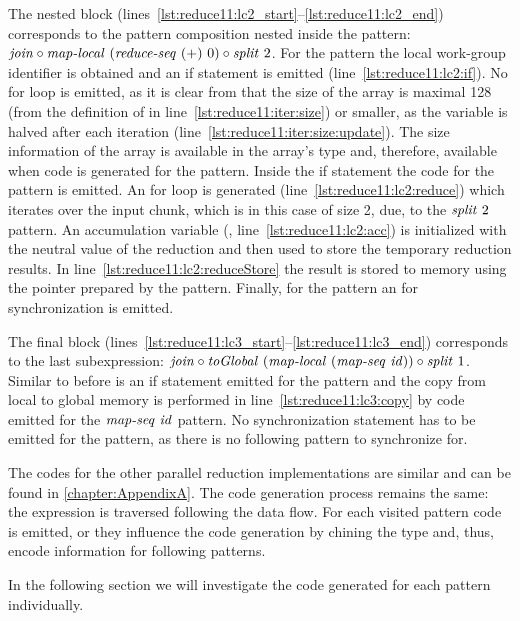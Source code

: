 The nested block (lines~\ref{lst:reduce11:lc2_start}--\ref{lst:reduce11:lc2_end}) corresponds to the pattern composition nested inside the \iterateN pattern:
$\text{\textit{join}} \circ \text{\textit{map-local}}\ (\text{\textit{reduce-seq}}\ (+)\ 0) \circ \text{\textit{split}}\ 2$.
For the \mapLocal pattern the local work-group identifier is obtained and an if statement is emitted (line~\ref{lst:reduce11:lc2:if}).
No for loop is emitted, as it is clear from that the size of the array is maximal 128 (from the definition of  in line~\ref{lst:reduce11:iter:size}) or smaller, as the variable is halved after each iteration (line~\ref{lst:reduce11:iter:size:update}).
The size information of the array is available in the array's type and, therefore, available when code is generated for the \mapLocal pattern.
Inside the if statement the code for the \reduceSeq pattern is emitted.
An for loop is generated (line~\ref{lst:reduce11:lc2:reduce}) which iterates over the input chunk, which is in this case of size 2, due, to the $\text{\textit{split}}\ 2$ pattern.
An accumulation variable (, line~\ref{lst:reduce11:lc2:acc}) is initialized with the neutral value of the reduction and then used to store the temporary reduction results.
In line~\ref{lst:reduce11:lc2:reduceStore} the result is stored to memory using the  pointer prepared by the \iterateN pattern.
Finally, for the \mapLocal pattern an  for synchronization is emitted.

The final block (lines~\ref{lst:reduce11:lc3_start}--\ref{lst:reduce11:lc3_end}) corresponds to the last subexpression:
$\text{\textit{join}} \circ \text{\textit{toGlobal}}\ (\text{\textit{map-local}}\ (\text{\textit{map-seq}}\ \text{\textit{id}})) \circ \text{\textit{split}}\ 1$.
Similar to before is an if statement emitted for the \mapLocal pattern and the copy from local to global memory is performed in line~\ref{lst:reduce11:lc3:copy} by code emitted for the $\text{\textit{map-seq}}\ \text{\textit{id}}$ pattern.
No synchronization statement has to be emitted for the \mapLocal pattern, as there is no following pattern to synchronize for.

\bigskip

The \OpenCL codes for the other parallel reduction implementations are similar and can be found in \autoref{chapter:AppendixA}.
The code generation process remains the same:
the expression is traversed following the data flow.
For each visited pattern \OpenCL code is emitted, or they influence the code generation by chining the type and, thus, encode information for following patterns.

In the following section we will investigate the \OpenCL code generated for each pattern individually.





